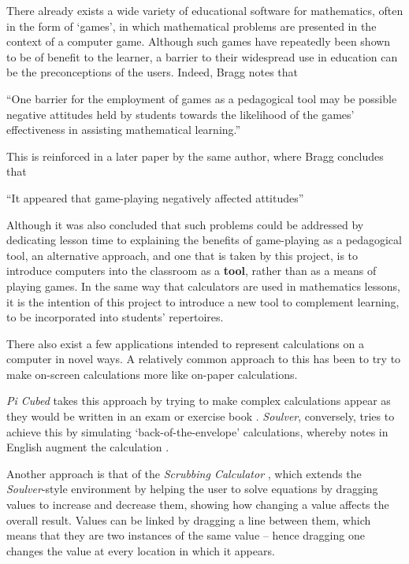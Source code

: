 \documentclass[12pt,twoside,notitlepage,xetex]{report}
\begin{document}
There already exists a wide variety of educational software for mathematics, often in the form of `games', in which mathematical problems are presented in the context of a computer game.  Although such games have repeatedly been shown to be of benefit to the learner, a barrier to their widespread use in education can be the preconceptions of the users. \cite{Swan2009} \cite{Delacruz2010}  Indeed, Bragg notes that
\begin{center}
\parbox[c]{\textwidth-2cm}{
\small
``One barrier for the employment of games as a pedagogical tool may be possible negative attitudes held by students towards the likelihood of the games' effectiveness in assisting mathematical learning.'' \cite{Bragg2006}
}
\end{center}
This is reinforced in a later paper by the same author, where Bragg concludes that
\begin{center}
\parbox[c]{\textwidth-2cm}{
\small
``It appeared that game-playing negatively affected attitudes'' \cite{Bragg2007}
}
\end{center}
Although it was also concluded that such problems could be addressed by dedicating lesson time to explaining the benefits of game-playing as a pedagogical tool, an alternative approach, and one that is taken by this project, is to introduce computers into the classroom as a {\bf tool}, rather than as a means of playing games.  In the same way that calculators are used in mathematics lessons, it is the intention of this project to introduce a new tool to complement learning, to be incorporated into students' repertoires.

There also exist a few applications intended to represent calculations on a
computer in novel ways.  A relatively common approach to this has been to try
to make on-screen calculations more like on-paper calculations.

\emph{Pi Cubed} takes this approach by trying to make complex calculations appear as they would be written in an exam or exercise book \cite{PiCubed}.  \emph{Soulver}, conversely, tries to achieve this by simulating `back-of-the-envelope' calculations, whereby notes in English augment the calculation \cite{Soulver}.

Another approach is that of the \emph{Scrubbing Calculator} \cite{ScrubCalc}, which extends the \emph{Soulver}-style environment by helping the user to solve equations by dragging values to increase and decrease them, showing how changing a value affects the overall result.  Values can be linked by dragging a line between them, which means that they are two instances of the same value -- hence dragging one changes the value at every location in which it appears.
\end{document}
